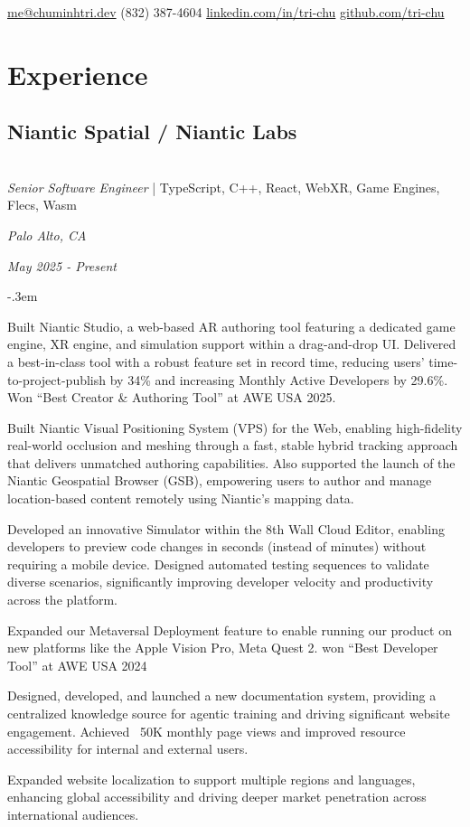 \documentclass{article}
\makeatletter
\def\faEmail{{\FAFR \symbol{"F0E0}}} %
\def\faPhone{{\FAFR \symbol{"F095}}} %
\def\faLinkedin{{\FAB \symbol{"F08C}}} %
\def\faGithub{{\FAB \symbol{"F09B}}} %
\let\olditemize=\itemize \let\endolditemize=\enditemize
\renewenvironment{itemize}{\olditemize[topsep=0em] \itemsep-.3em}{\endolditemize}
\newcommand{\link}[1]{\href{https://#1}{#1}}
\newenvironment{twocolentry}[2][]{
    \def\secondColumn{#2}
    \raggedright
    \setcolumnwidth{\fill, 6cm}
    \begin{paracol}{2}
}{
    \switchcolumn \raggedleft \secondColumn
    \end{paracol}
} %
\renewcommand{\maketitle}{
  \begin{flushleft}
    \Huge\bfseries\theauthor
  \end{flushleft}
  \begin{bfseries}
    \faEmail    \hspace{1pt} \href{mailto:me@chuminhtri.dev}{me@chuminhtri.dev} \quad
    \faPhone    \hspace{1pt} (832) 387-4604 \quad
    \faLinkedin \hspace{1pt} \link{linkedin.com/in/tri-chu} \quad
    \faGithub   \hspace{1pt} \link{github.com/tri-chu}
  \end{bfseries}
}
\makeatother
\begin{document}
\author{\color{accentcolor}Tri Chu}
\maketitle


\section{Experience}

\begin{twocolentry}{
  \textit{Palo Alto, CA}

  \textit{May 2025 - Present}
}
\subsection{Niantic Spatial / Niantic Labs}\hfill\\

\textit{Senior Software Engineer} | TypeScript, C++, React, WebXR, Game Engines, Flecs, Wasm 
\end{twocolentry}

\begin{itemize}
  \item Built Niantic Studio, a web-based AR authoring tool featuring a dedicated game engine, XR
  engine, and simulation support within a drag-and-drop UI. Delivered a best-in-class tool with a
  robust feature set in record time, reducing users’ time-to-project-publish by 34\% and increasing
  Monthly Active Developers by 29.6\%. Won “Best Creator \& Authoring Tool” at AWE USA 2025.
  \item Built Niantic Visual Positioning System (VPS) for the Web, enabling high-fidelity real-world
  occlusion and meshing through a fast, stable hybrid tracking approach that delivers unmatched
  authoring capabilities. Also supported the launch of the Niantic Geospatial Browser (GSB),
  empowering users to author and manage location-based content remotely using Niantic’s mapping
  data.
  \item Developed an innovative Simulator within the 8th Wall Cloud Editor, enabling developers to
  preview code changes in seconds (instead of minutes) without requiring a mobile device. Designed
  automated testing sequences to validate diverse scenarios, significantly improving developer
  velocity and productivity across the platform.
  \item Expanded our Metaversal Deployment feature to enable running our product on new platforms
  like the Apple Vision Pro, Meta Quest 2. won “Best Developer Tool” at AWE USA 2024
  \item Designed, developed, and launched a new documentation system, providing a centralized
  knowledge source for agentic training and driving significant website engagement. Achieved ~50K
  monthly page views and improved resource accessibility for internal and external users.
  \item Expanded website localization to support multiple regions and languages, enhancing global
  accessibility and driving deeper market penetration across international audiences.
\end{itemize}
\end{document}
